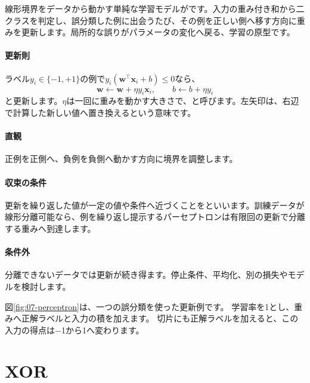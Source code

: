 線形境界をデータから動かす単純な学習モデルがです。入力の重み付き和から二クラスを判定し、誤分類した例に出会うたび、その例を正しい側へ移す方向に重みを更新します。局所的な誤りがパラメータの変化へ戻る、学習の原型です。

\begingroup
\begingroup
\paragraph{更新則}
        ラベル$y_i\in\{-1,+1\}$の例で$y_i(\mathbf{w}^\top\mathbf{x}_i+b)\le0$なら、
        \[
          \mathbf{w}\leftarrow\mathbf{w}+\eta y_i\mathbf{x}_i,\qquad
          b\leftarrow b+\eta y_i
        \]
        と更新します。$\eta$は一回に重みを動かす大きさで、と呼びます。左矢印は、右辺で計算した新しい値へ置き換えるという意味です。

\paragraph{直観}
        正例を正側へ、負例を負側へ動かす方向に境界を調整します。

\par
\endgroup
\medskip
\begingroup
\paragraph{収束の条件}
        更新を繰り返した値が一定の値や条件へ近づくことをといいます。訓練データが線形分離可能なら、例を繰り返し提示するパーセプトロンは有限回の更新で分離する重みへ到達します。

\paragraph{条件外}
        分離できないデータでは更新が続き得ます。停止条件、平均化、別の損失やモデルを検討します。

\par
\endgroup
\par
\endgroup


図\ref{fig:07-perceptron}は、一つの誤分類を使った更新例です。
学習率を1とし、重みへ正解ラベルと入力の積を加えます。
切片にも正解ラベルを加えると、この入力の得点は−1から1へ変わります。


\section{XOR}
\label{sec:06-machine-learning-16}


